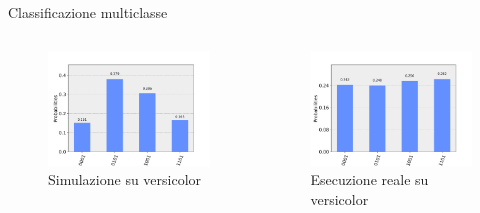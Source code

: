 \documentclass{beamer}
\begin{document}
    \begin{frame}{Classificazione multiclasse}
        \begin{columns}
            \begin{figure}[h]
                \centering
                \includegraphics[width=\linewidth]{gfx/multiclass_versicolor}
                \caption{Simulazione su versicolor}
                \label{fig:multiclass.versicolor}
            \end{figure}
            \begin{figure}[h]
                \centering
                \includegraphics[width=\linewidth]{gfx/versicolor_reale_20191015_1506.png}
                \caption{Esecuzione reale su versicolor}
                \label{fig:multiclass.virginica}

\end{figure}
\end{columns}
\end{frame}
\end{document}

